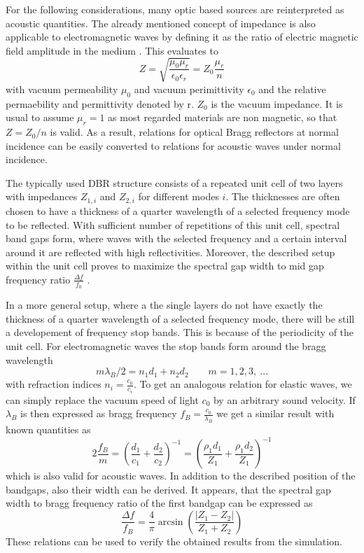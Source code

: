 For the following considerations, many optic based sources are reinterpreted
as acoustic quantities. The already mentioned concept of impedance is also
applicable to electromagnetic waves by defining it as the ratio of electric
magnetic field amplitude in the medium \cite{brekhovskikh2012waves}. This
evaluates to
\begin{equation}
    Z = \sqrt{\frac{\mu_0\mu_r}{\epsilon_0\epsilon_r}} = Z_0 \frac{\mu_r}{n}
\end{equation}
with vacuum permeability $\mu_0$ and vacuum perimittivity $\epsilon_0$ and
the relative permaebility and permittivity denoted by r. $Z_0$ is the vacuum
impedance. It is usual to assume $\mu_r=1$ as most regarded materials are non
magnetic, so that $Z = Z_0/n$ is valid. As a result, relations for optical
Bragg reflectors at normal incidence can be easily converted to relations for
acoustic waves under normal incidence.

The typically used DBR structure consists of a repeated unit cell of two layers
with impedances $Z_{1,i}$ and $Z_{2,i}$ for different modes $i$. The
thicknesses are often chosen to have a thickness of a quarter wavelength
of a selected frequency mode to be reflected. With sufficient number of
repetitions of this unit cell, spectral band gaps form, where waves with the
selected frequency and a certain interval around it are reflected with high
reflectivities. Moreover, the described setup within the unit cell proves to
maximize the spectral gap width to mid gap frequency ratio
$\frac{\Delta f}{f_0}$ \cite{Osting2012}.

In a more general setup, where a the single layers do not have exactly the
thickness of a quarter wavelength of a selected frequency mode, there will be
still a developement of frequency stop bands. This is because of the
periodicity of the unit cell. For electromagnetic waves the stop bands form
around the bragg wavelength
\begin{equation}
    m\lambda_B/2 = n_1 d_1 + n_2 d_2 \quad\quad m=1,2,3,\ ...
\end{equation}
with refraction indices $n_i=\frac{c_0}{c_i}$. To get an analogous relation for
elastic waves, we can simply replace the vacuum speed of light $c_0$ by an
arbitrary sound velocity. If $\lambda_B$ is then expressed as bragg frequency
$f_B = \frac{c_0}{\lambda_B}$ we get a similar result with known quantities as
\begin{equation}
    2\frac{f_B}{m} = \left(\frac{d_1}{c_1}+\frac{d_2}{c_2}\right)^{-1} =
    \left(\frac{\rho_1 d_1}{Z_1}+\frac{\rho_1 d_2}{Z_1}\right)^{-1}
\end{equation}
which is also valid for acoustic waves. In addition to the described position
of the bandgaps, also their width can be derived. It appears, that the spectral
gap width to bragg frequency ratio of the first bandgap can be expressed as
\begin{equation}
    \frac{\Delta f}{f_B} = \frac{4}{\pi} \arcsin \left(
    \frac{|Z_1-Z_2|}{Z_1+Z_2}
    \right)
\end{equation}
These relations can be used to verify the obtained results from the simulation.